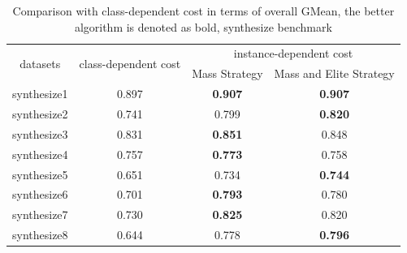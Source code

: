 \documentclass{article}
\begin{document}
\begin{table}[!ht]
	\centering
	\begin{tabular}{|c||c|cc|}
		\hline
		\multirow{2}{*}{datasets} & \multirow{2}{*}{class-dependent cost}  &\multicolumn{2}{c|}{instance-dependent cost}                                                                                                                           \\ \cline{3-4} 
		&                                      & \multicolumn{1}{c|}{Mass Strategy}                     & Mass and Elite Strategy            \\ \hline \hline
		synthesize1               & 0.897                            & \multicolumn{1}{c|}{\textbf{0.907}}          & \textbf{0.907}          \\ \hline
		synthesize2               & 0.741                        & \multicolumn{1}{c|}{0.799}    & \textbf{0.820}         \\ \hline
		synthesize3               & 0.831                         & \multicolumn{1}{c|}{\textbf{0.851}}   & 0.848          \\ \hline
		synthesize4               & 0.757                        & \multicolumn{1}{c|}{\textbf{0.773}}           & 0.758          \\ \hline
		synthesize5               & 0.651                      & \multicolumn{1}{c|}{0.734}          & \textbf{0.744} \\ \hline
		synthesize6               & 0.701                          & \multicolumn{1}{c|}{\textbf{0.793}}            & 0.780          \\ \hline
		synthesize7               & 0.730                   & \multicolumn{1}{c|}{\textbf{0.825}}               & 0.820          \\ \hline
		synthesize8               & 0.644             & \multicolumn{1}{c|}{0.778}            & \textbf{0.796}          \\ \hline
	\end{tabular}
	\label{tab5:overall}
	\caption{Comparison with class-dependent cost in terms of overall GMean, the better algorithm is denoted as bold, synthesize benchmark}
\end{table}
\end{document}
